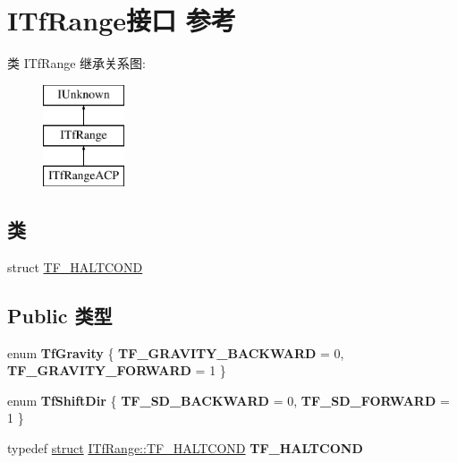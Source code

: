 \hypertarget{interface_i_tf_range}{}\section{I\+Tf\+Range接口 参考}
\label{interface_i_tf_range}
类 I\+Tf\+Range 继承关系图\+:\begin{figure}[H]
\begin{center}
\leavevmode
\includegraphics[height=3.000000cm]{interface_i_tf_range}
\end{center}
\end{figure}
\subsection*{类}
\begin{DoxyCompactItemize}
\item 
struct \hyperlink{struct_i_tf_range_1_1_t_f___h_a_l_t_c_o_n_d}{T\+F\+\_\+\+H\+A\+L\+T\+C\+O\+ND}
\end{DoxyCompactItemize}
\subsection*{Public 类型}
\begin{DoxyCompactItemize}
\item 
\mbox{\label{interface_i_tf_range_a24633316494369376b868625a4cec9a4}} 
enum {\bfseries Tf\+Gravity} \{ {\bfseries T\+F\+\_\+\+G\+R\+A\+V\+I\+T\+Y\+\_\+\+B\+A\+C\+K\+W\+A\+RD} = 0, 
{\bfseries T\+F\+\_\+\+G\+R\+A\+V\+I\+T\+Y\+\_\+\+F\+O\+R\+W\+A\+RD} = 1
 \}
\item 
\mbox{\label{interface_i_tf_range_abdb232649ff8221654eaa588c461f808}} 
enum {\bfseries Tf\+Shift\+Dir} \{ {\bfseries T\+F\+\_\+\+S\+D\+\_\+\+B\+A\+C\+K\+W\+A\+RD} = 0, 
{\bfseries T\+F\+\_\+\+S\+D\+\_\+\+F\+O\+R\+W\+A\+RD} = 1
 \}
\item 
\mbox{\label{interface_i_tf_range_a5c396aa65c5352c6092fa550727e8570}} 
typedef \hyperlink{interfacestruct}{struct} \hyperlink{struct_i_tf_range_1_1_t_f___h_a_l_t_c_o_n_d}{I\+Tf\+Range\+::\+T\+F\+\_\+\+H\+A\+L\+T\+C\+O\+ND} {\bfseries T\+F\+\_\+\+H\+A\+L\+T\+C\+O\+ND}
\end{DoxyCompactItemize}
